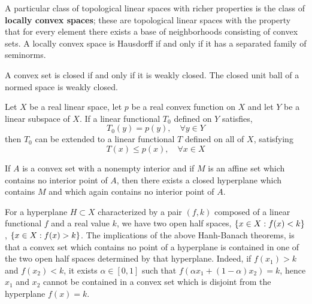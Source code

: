 A particular class of topological linear spaces with richer properties is the class of \textbf{locally convex spaces}; these are topological linear spaces with the property that for every element there exists a base of neighborhoods consisting of convex sets. A locally convex space is Hausdorff if and only if it has a separated family of seminorms. 


A convex set is closed if and only if it is weakly closed. The closed unit ball of a normed space is weakly closed.


\begin{theorem}
	Let $X$ be a real linear space, let $p$ be a real convex function on $X$ and let $Y$ be a linear subspace of $X$. If a linear functional $T_0$ defined on $Y$ satisfies,
	\begin{equation*}
		T_0(y)=p(y),\quad \forall y \in Y
	\end{equation*}
	then $T_0$ can be extended to a linear functional $T$ defined on all of $X$, satisfying
	\begin{equation*}
		T(x)\leq p(x),\quad \forall x \in X
	\end{equation*}
\end{theorem}

\begin{theorem}
If $A$ is a convex set with a nonempty interior and if $M$ is an affine set
which contains no interior point of $A$, then there exists a closed hyperplane which contains $M$ and which again contains no interior point of $A$.
\end{theorem}


For a hyperplane $H\subset X$ characterized by a pair $(f,k)$ composed of a linear functional $f$ and a real value $k$, we have two open half spaces, $\left\lbrace x\in X: f(x)<k \right\rbrace$, $\left\lbrace x\in X: f(x)>k \right\rbrace$.
The implications of the above Hanh-Banach theorems, is that a convex set which contains no point of a hyperplane is contained in one of the two open half spaces determined by that hyperplane. Indeed, if $f(x_1)>k$ and $f(x_2)<k$, it exists $\alpha\in[0,1]$ such that $f(\alpha x_1+(1-\alpha)x_2)=k$, hence $x_1$ and $x_2$ cannot be contained in a convex set which is disjoint from the hyperplane $f(x)=k$.


